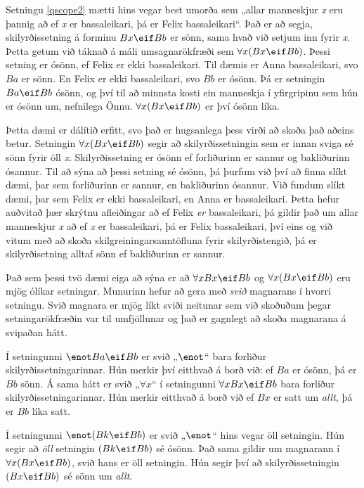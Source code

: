 Setningu \ref{qscope2} mætti hins vegar best umorða sem „allar manneskjur \emph{x} eru þannig að ef \emph{x} er bassaleikari, þá er Felix bassaleikari“. Það er að segja, skilyrðissetning á forminu $Bx \eif Bb$ er sönn, sama hvað við setjum inn fyrir \emph{x}. Þetta getum við táknað á máli umsagnarökfræði sem $\forall x (Bx \eif Bb)$. Þessi setning er ósönn, ef Felix er ekki bassaleikari. Til dæmis er Anna bassaleikari, svo $Ba$ er sönn. En Felix er ekki bassaleikari, svo $Bb$ er ósönn. Þá er setningin $Ba \eif Bb$ ósönn, og því til að minnsta kosti ein manneskja í yfirgripinu sem hún er ósönn um, nefnilega Önnu. $\forall x (Bx \eif Bb)$ er því ósönn líka.

Þetta dæmi er dálítið erfitt, svo það er hugsanlega þess virði að skoða það aðeins betur. Setningin $\forall x (Bx \eif Bb)$ segir að skilyrðissetningin sem er innan sviga sé sönn fyrir öll \emph{x}. Skilyrðissetning er ósönn ef forliðurinn er sannur og bakliðurinn ósannur. Til að sýna að þessi setning sé ósönn, þá þurfum við því að finna slíkt dæmi, þar sem forliðurinn er sannur, en bakliðurinn ósannur. Við fundum slíkt dæmi, þar sem Felix er ekki bassaleikari, en Anna er bassaleikari. Þetta hefur auðvitað þær skrýtnu afleiðingar að ef Felix \emph{er} bassaleikari, þá gildir það um allar manneskjur \emph{x} að ef \emph{x} er bassaleikari, þá er Felix bassaleikari, því eins og við vitum með að skoða skilgreiningarsanntöfluna fyrir skilyrðistengið, þá er skilyrðisetning alltaf sönn ef bakliðurinn er sannur. 

Það sem þessi tvö dæmi eiga að sýna er að $\forall x Bx \eif Bb$ og $\forall x (Bx \eif Bb)$ eru mjög ólíkar setningar. Munurinn hefur að gera með \emph{svið} magnarans í hvorri setningu. Svið magnara er mjög líkt sviði neitunar sem við skoðuðum þegar setningarökfræðin var til umfjöllunar og það er gagnlegt að skoða magnarana á svipaðan hátt. 

Í setningunni $\enot Ba \eif Bb$ er svið „$\enot$“ bara forliður skilyrðissetningarinnar. Hún merkir því eitthvað á borð við: ef $Ba$ er ósönn, þá er $Bb$ sönn.  Á sama hátt er svið „$\forall x$“ í setningunni $\forall x Bx \eif Bb$ bara forliður skilyrðissetningarinnar. Hún merkir eitthvað á borð við ef $Bx$ er satt um \emph{allt}, þá er $Bb$ líka satt.

Í setningunni $\enot(Bk \eif Bb)$ er svið „$\enot$“ hins vegar öll setningin. Hún segir að \emph{öll} setningin $(Bk \eif Bb)$ sé ósönn. Það sama gildir um magnarann í $\forall x (Bx \eif Bb)$, svið hans er öll setningin. Hún segir því að skilyrðissetningin $(Bx \eif Bb)$ sé sönn um \emph{allt}.


